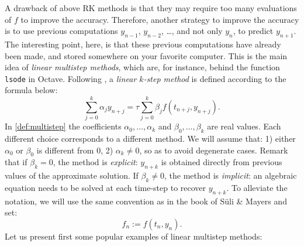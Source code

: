 \documentclass{article}
\begin{document}
A drawback of above RK methods is that they may require too many evaluations of $f$ to improve the accuracy. Therefore, another strategy to improve the accuracy is to use previous computations $y_{n-1}$, $y_{n-2}$, \dots, and not only $y_n$, to predict $y_{n+1}$. The interesting point, here, is that these previous computations have already been made, and stored somewhere on your favorite computer. This is the main idea of \emph{linear multistep methods}, which are, for instance, behind the function \texttt{lsode} in Octave. Following \cite{suli03}, a \emph{linear $k$-step method} is defined according to the formula below:
\begin{equation} \label{def:multistep}
\sum_{j=0}^k \alpha_j y_{n+j} = \tau \sum_{j=0}^k \beta_j f ( t_{n+j} , y_{n+j} ).    
\end{equation}
In \eqref{def:multistep} the coefficients $\alpha_0,\ldots,\alpha_k$ and $\beta_0,\ldots,\beta_k$ are real values. Each different choice corresponds to a different method. We will assume that: 1) either $\alpha_0$ or $\beta_0$ is different from $0$, 2) $\alpha_k \neq 0$, so as to avoid degenerate cases. Remark that if $\beta_k = 0$, the method is \emph{explicit}: $y_{n+k}$ is obtained directly from previous values of the approximate solution. If $\beta_k \neq 0$, the method is \emph{implicit}: an algebraic equation needs to be solved at each time-step to recover $y_{n+k}$. To alleviate the notation, we will use the same convention as in the book of S\"uli \& Mayers \cite{suli03} and set:
\[
f_n := f ( t_n , y_n ).
\]
Let us present first some popular examples of linear multistep methods:
\end{document}
